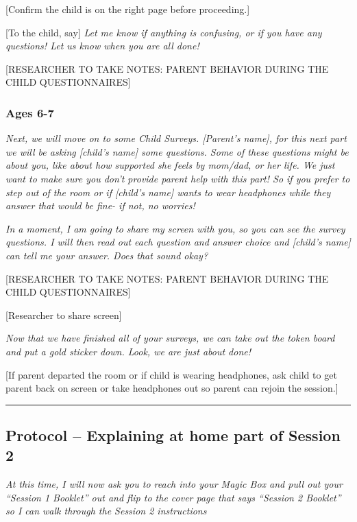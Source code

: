\documentclass[]{book}
\begin{document}
{[}Confirm the child is on the right page before proceeding.{]}

{[}To the child, say{]} \emph{Let me know if anything is confusing, or if you have any questions! Let us know when you are all done!}

{[}RESEARCHER TO TAKE NOTES: PARENT BEHAVIOR DURING THE CHILD QUESTIONNAIRES{]}

\hypertarget{ages-6-7-1}{%
\subsubsection{Ages 6-7}\label{ages-6-7-1}}

\emph{Next, we will move on to some Child Surveys. {[}Parent's name{]}, for this next part we will be asking {[}child's name{]} some questions. Some of these questions might be about you, like about how supported she feels by mom/dad, or her life. We just want to make sure you don't provide parent help with this part! So if you prefer to step out of the room or if {[}child's name{]} wants to wear headphones while they answer that would be fine- if not, no worries!}

\emph{In a moment, I am going to share my screen with you, so you can see the survey questions. I will then read out each question and answer choice and {[}child's name{]} can tell me your answer. Does that sound okay? }

{[}RESEARCHER TO TAKE NOTES: PARENT BEHAVIOR DURING THE CHILD QUESTIONNAIRES{]}

{[}Researcher to share screen{]}

\emph{Now that we have finished all of your surveys, we can take out the token board and put a gold sticker down. Look, we are just about done!}

{[}If parent departed the room or if child is wearing headphones, ask child to get parent back on screen or take headphones out so parent can rejoin the session.{]}

\begin{center}\rule{0.5\linewidth}{0.5pt}\end{center}

\hypertarget{protocol-explaining-at-home-part-of-session-2}{%
\subsection{Protocol -- Explaining at home part of Session 2}\label{protocol-explaining-at-home-part-of-session-2}}

\emph{At this time, I will now ask you to reach into your Magic Box and pull out your ``Session 1 Booklet'' out and flip to the cover page that says ``Session 2 Booklet'' so I can walk through the Session 2 instructions}
\end{document}
